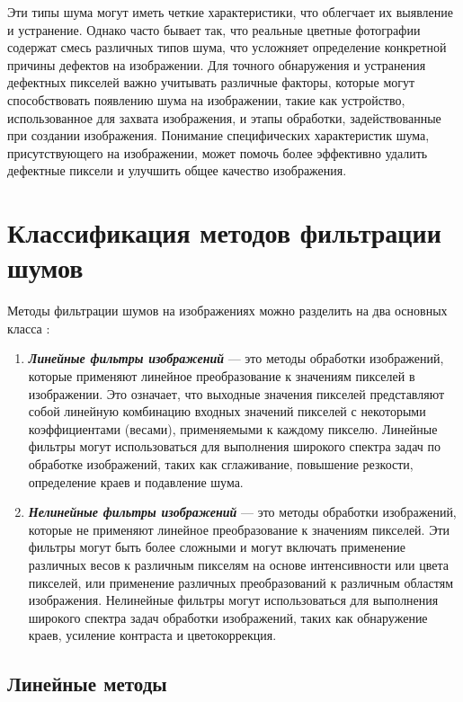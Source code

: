Эти типы шума могут иметь четкие характеристики, что облегчает их выявление и устранение. Однако часто бывает так, что реальные цветные фотографии содержат смесь различных типов шума, что усложняет определение конкретной причины дефектов на изображении. Для точного обнаружения и устранения дефектных пикселей важно учитывать различные факторы, которые могут способствовать появлению шума на изображении, такие как устройство, использованное для захвата изображения, и этапы обработки, задействованные при создании изображения. Понимание специфических характеристик шума, присутствующего на изображении, может помочь более эффективно удалить дефектные пиксели и улучшить общее качество изображения.

\chapter{Классификация методов фильтрации шумов}

Методы фильтрации шумов на изображениях можно разделить на два основных класса \cite{filtertypes}:

\begin{enumerate}
    \item \textbf{\textit{Линейные фильтры изображений}} --- это методы обработки изображений, которые применяют линейное преобразование к значениям пикселей в изображении. Это означает, что выходные значения пикселей представляют собой линейную комбинацию входных значений пикселей с некоторыми коэффициентами (весами), применяемыми к каждому пикселю. Линейные фильтры могут использоваться для выполнения широкого спектра задач по обработке изображений, таких как сглаживание, повышение резкости, определение краев и подавление шума.

    \item \textbf{\textit{Нелинейные фильтры изображений}} --- это методы обработки изображений, которые не применяют линейное преобразование к значениям пикселей. Эти фильтры могут быть более сложными и могут включать применение различных весов к различным пикселям на основе интенсивности или цвета пикселей, или применение различных преобразований к различным областям изображения. Нелинейные фильтры могут использоваться для выполнения широкого спектра задач обработки изображений, таких как обнаружение краев, усиление контраста и цветокоррекция.
\end{enumerate}

\section{Линейные методы}
